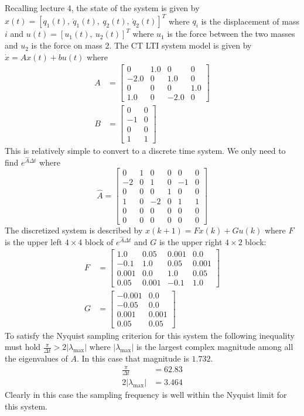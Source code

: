 \documentclass[11pt]{article}
\begin{document}
\subparagraph*{}
Recalling lecture 4, the state of the system is given by $x(t) = [q_1(t),\ \dot{q}_1(t),\ q_2(t),\ \dot{q}_2(t)]^T$ where $q_i$ is the displacement of mass $i$ and $u(t) = [u_1(t),\ u_2(t)]^T$ where $u_1$ is the force between the two masses and $u_2$ is the force on mass 2. The CT LTI system model is given by $\dot{x} = Ax(t)+bu(t)$ where
\begin{align*}
	A &= \begin{bmatrix} 0&1.0&0&0 \\ -2.0&0&1.0&0 \\ 0&0&0&1.0 \\ 1.0&0&-2.0&0 \end{bmatrix} \\ 
	B&= \begin{bmatrix} 0&0 \\ -1&0 \\ 0&0 \\ 1&1 \end{bmatrix}
\end{align*}
This is relatively simple to convert to a discrete time system. We only need to find $e^{\hat{A}\Delta t}$ where
\begin{equation*}
	\hat{A} = \begin{bmatrix} 0&1&0&0&0&0 \\ -2&0&1&0&-1&0 \\ 0&0&0&1&0&0 \\ 1&0&-2&0&1&1 \\ 0&0&0&0&0&0 \\ 0&0&0&0&0&0 \end{bmatrix} 
\end{equation*}
The discretized system is described by $x(k+1)=Fx(k)+Gu(k)$ where $F$ is the upper left $4\times 4$ block of $e^{\hat{A}\Delta t}$ and $G$ is the upper right $4\times 2$ block:
\begin{align*}
	F&=\begin{bmatrix}1.0 & 0.05 & 0.001 & 0.0 \\ -0.1 & 1.0 & 0.05 & 0.001 \\ 0.001 & 0.0 & 1.0 & 0.05 \\ 0.05 & 0.001 & -0.1 & 1.0 \end{bmatrix} \\
	G&=\begin{bmatrix} -0.001 & 0.0 \\ -0.05 & 0.0 \\ 0.001 & 0.001 \\ 0.05 & 0.05 \end{bmatrix}
\end{align*}
To satisfy the Nyquist sampling criterion for this system the following inequality must hold $\frac{\pi}{\Delta t} > 2|\lambda_\text{max}|$ where $|\lambda_\text{max}|$ is the largest complex magnitude among all the eigenvalues of $A$. In this case that magnitude is $1.732$. 
\begin{align*}
	\frac{\pi}{\Delta t} &= 62.83 \\
	2|\lambda_\text{max}| &= 3.464
\end{align*}
Clearly in this case the sampling frequency is well within the Nyquist limit for this system.
\end{document}
